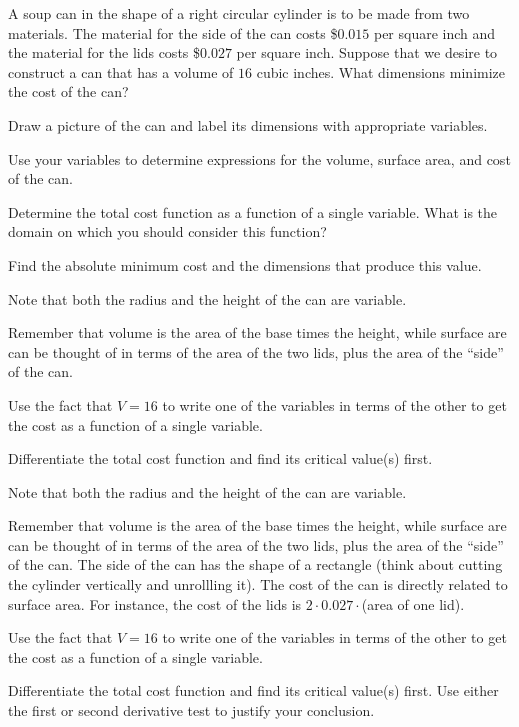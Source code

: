 \begin{activity} \label{A:3.4.1} A soup can in the shape of a right circular cylinder is to be made from two materials.  The material for the side of the can costs \$$0.015$ per square inch and the material for the lids costs \$$0.027$ per square inch.  Suppose that we desire to construct a can that has a volume of $16$ cubic inches.  What dimensions minimize the cost of the can?
\ba
	\item Draw a picture of the can and label its dimensions with appropriate variables.
	\item Use your variables to determine expressions for the volume, surface area, and cost of the can.
	\item Determine the total cost function as a function of a single variable.  What is the domain on which you should consider this function?
	\item Find the absolute minimum cost and the dimensions that produce this value.
\ea
\end{activity}
\begin{smallhint}
\ba
	\item Note that both the radius and the height of the can are variable.
	\item Remember that volume is the area of the base times the height, while surface are can be thought of in terms of the area of the two lids, plus the area of the ``side'' of the can.
	\item Use the fact that $V = 16$ to write one of the variables in terms of the other to get the cost as a function of a single variable.
	\item Differentiate the total cost function and find its critical value(s) first.
\ea
\end{smallhint}
\begin{bighint}
\ba
	\item Note that both the radius and the height of the can are variable.
	\item Remember that volume is the area of the base times the height, while surface are can be thought of in terms of the area of the two lids, plus the area of the ``side'' of the can.  The side of the can has the shape of a rectangle (think about cutting the cylinder vertically and unrollling it).  The cost of the can is directly related to surface area.  For instance, the cost of the lids is $2 \cdot 0.027 \cdot$(area of one lid).
	\item Use the fact that $V = 16$ to write one of the variables in terms of the other to get the cost as a function of a single variable.
	\item Differentiate the total cost function and find its critical value(s) first.  Use either the first or second derivative test to justify your conclusion.
\ea
\end{bighint}
